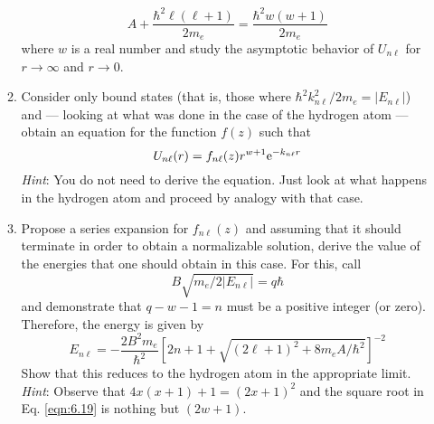 \documentclass[../psets.tex]{subfiles}
\begin{document}
\begin{enumerate}
\begin{enumerate}
\begin{equation}
            A+\frac{\hbar^2\ell(\ell+1)}{2m_e} = \frac{\hbar^2w(w+1)}{2m_e}
        \end{equation}
        where $w$ is a real number and study the asymptotic behavior of $U_{n\ell}$ for $r\to\infty$ and $r\to 0$.
        \item Consider only bound states (that is, those where $\hbar^2k_{n\ell}^2/2m_e=|E_{n\ell}|$) and --- looking at what was done in the case of the hydrogen atom --- obtain an equation for the function $f(z)$ such that
        \begin{equation}
            U_{n\ell}(r) = f_{n\ell}(z)r^{w+1}\e[-k_{n\ell}r]
        \end{equation}
        \emph{Hint}: You do not need to derive the equation. Just look at what happens in the hydrogen atom and proceed by analogy with that case.
        \item Propose a series expansion for $f_{n\ell}(z)$ and assuming that it should terminate in order to obtain a normalizable solution, derive the value of the energies that one should obtain in this case. For this, call
        \begin{equation}
            B\sqrt{m_e/2|E_{n\ell}|} = q\hbar
        \end{equation}
        and demonstrate that $q-w-1=n$ must be a positive integer (or zero). Therefore, the energy is given by
        \begin{equation}\label{eqn:6.19}
            E_{n\ell} = -\frac{2B^2m_e}{\hbar^2}\left[ 2n+1+\sqrt{(2\ell+1)^2+8m_eA/\hbar^2} \right]^{-2}
        \end{equation}
        Show that this reduces to the hydrogen atom in the appropriate limit. \emph{Hint}: Observe that $4x(x+1)+1=(2x+1)^2$ and the square root in Eq. \ref{eqn:6.19} is nothing but $(2w+1)$.
    \end{enumerate}
\end{enumerate}
\end{document}
